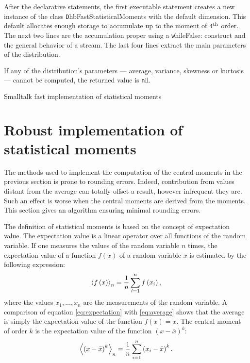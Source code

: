 After the declarative statements, the first executable statement
creates a new instance of the class {\texttt
DhbFastStatisticalMoments} with the default dimension. This
default allocates enough storage to accumulate up to the moment of
$4^{\mathop{\textrm{th}}}$ order. The next two lines are the accumulation proper using
a {\texttt whileFalse:} construct and the general behavior of a
stream. The last four lines extract the main parameters of the
distribution.

If any of the distribution's parameters --- average, variance,
skewness or kurtosis --- cannot be computed, the returned value is
{\texttt nil}.

\begin{listing} Smalltalk fast implementation of statistical moments \label{ls:fastmoments}

\end{listing}

\section{Robust implementation of statistical moments}
\label{sec:robustmoment} The methods used to implement the
computation of the central moments in the previous section is
prone to rounding errors. Indeed, contribution from values distant
from the average can totally offset a result, however infrequent
they are. Such an effect is worse when the central moments are
derived from the moments. This section gives an algorithm ensuring
minimal rounding errors.

The definition of statistical moments is based on the concept of
expectation value. The expectation value is a linear operator over
all functions of the random variable. If one measures the values
of the random variable $n$ times, the expectation value of a
function $f\left(x\right)$ of a random variable $x$ is estimated
by the following expression:
\begin{equation}
\label{eq:expectation}
 \left\langle f\left(x\right)\right\rangle_n
= {1\over n}\sum_{i=1}^n f\left(x_i\right),
\end{equation}
where the values $x_1,\ldots,x_n$ are the measurements of the
random variable. A comparison of equation \ref{eq:expectation}
with \ref{eq:average} shows that the average is simply the
expectation value of the function $f\left(x\right)=x$. The central
moment of order $k$ is the expectation value of the function
$\left(x-\bar{x}\right)^k$:
\begin{equation}
\label{eq:expectmoment}
 \left\langle \left(x-\bar{x}\right)^k\right\rangle_n
= {1\over n}\sum_{i=1}^n \left(x_i-\bar{x}\right)^k.
\end{equation}

